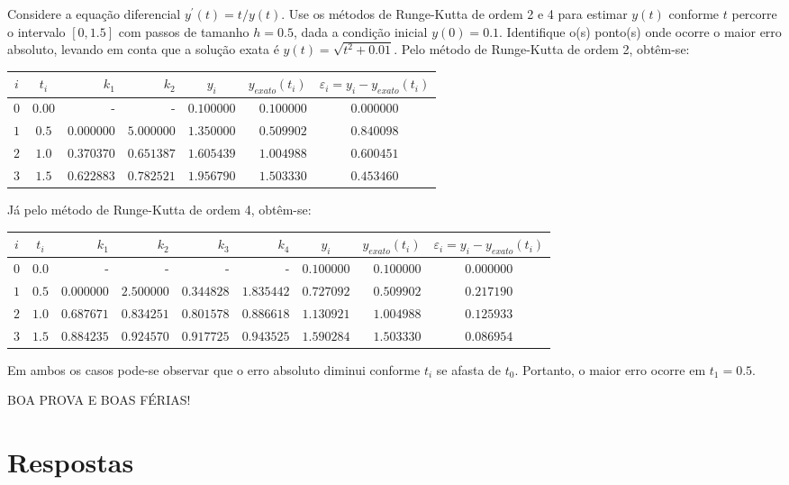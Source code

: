 \documentclass[12pt,a4paper]{article}
\begin{document}
\begin{ExerciseList}
\Exercise[title={3,0}] 
Considere a equação diferencial $y^\prime(t) = t/y(t)$. Use os métodos de Runge-Kutta de ordem 2 e 4 para estimar $y(t)$ conforme $t$ percorre o intervalo $[0, 1.5]$ com passos de tamanho $h = 0.5$, dada a condição inicial $y(0) = 0.1$. Identifique o(s) ponto(s) onde ocorre o maior erro absoluto, levando em conta que a solução exata é $y(t)=\sqrt{t^2 + 0.01}$.
\Answer Pelo método de Runge-Kutta de ordem 2, obtêm-se:
\begin{center}
\begin{tabular}{|c|c|r|r|c|r|c|}
\hline
  $i$
& $t_i$
& $k_1$
& $k_2$
& $y_i$
& $y_{exato}(t_i)$
& $\varepsilon_i = y_i-y_{exato}(t_i)$ \\ \hline\hline
$0$ & $0.00$ &   -     &   -     & $ 0.100000$ & $ 0.100000$ & $0.000000$ \\ \hline
$1$ & $0.5$ & $0.000000$ & $5.000000$ & $ 1.350000$ & $0.509902$ & $0.840098$ \\ \hline
$2$ & $1.0$ & $0.370370$ & $0.651387$ & $ 1.605439$ & $1.004988$ & $0.600451$ \\ \hline
$3$ & $1.5$ & $0.622883$ & $0.782521$ & $ 1.956790$ & $1.503330$ & $0.453460$ \\ \hline
\end{tabular}
\end{center}
\medskip
Já pelo método de Runge-Kutta de ordem 4, obtêm-se:
\begin{center}
\begin{tabular}{|c|c|r|r|r|r|c|r|c|}
\hline
  $i$
& $t_i$
& $k_1$
& $k_2$
& $k_3$
& $k_4$
& $y_i$
& $y_{exato}(t_i)$
& {\footnotesize
$\varepsilon_i = y_i-y_{exato}(t_i)$ } \\ \hline\hline
$0$ & $0.0$ &   -     &   -     &   -     &   -     & $ 0.100000$ & $ 0.100000$ & $0.000000$ \\ \hline
$1$ & $0.5$ & $ 0.000000$ & $2.500000$ & $0.344828$ & $1.835442$ & $0.727092$ & $0.509902$ & $0.217190$ \\ \hline
$2$ & $1.0$ & $0.687671$ & $0.834251$ & $0.801578$ & $0.886618$ & $1.130921$ & $1.004988$ & $0.125933$ \\ \hline
$3$ & $1.5$ & $0.884235$ & $0.924570$ & $0.917725$ & $0.943525$ & $1.590284$ & $1.503330$ & $0.086954$ \\ \hline
\end{tabular}
\end{center}
\medskip
Em ambos os casos pode-se observar que o erro absoluto diminui conforme $t_i$ se afasta de $t_0$. Portanto, o maior erro ocorre em $t_1=0.5$.
\end{ExerciseList}

\vspace{0.4cm}
\begin{center}
BOA PROVA E BOAS FÉRIAS!
\end{center}

\newpage
\restoregeometry
\section*{Respostas}
\shipoutAnswer
\end{document}
